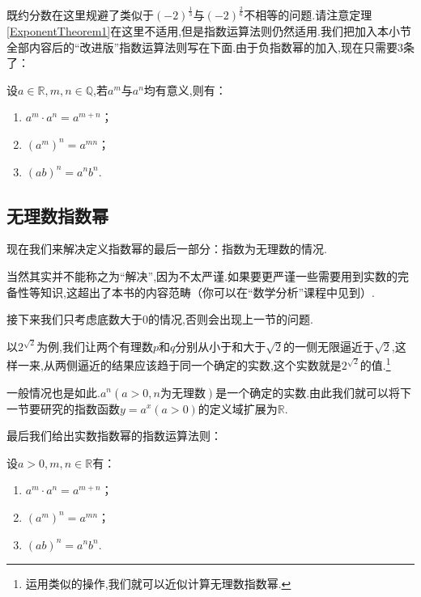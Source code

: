 \documentclass[lang=cn,math=cm,chinesefont=nofont,11pt,scheme=chinese,twocol]{elegantbook}
\begin{document}
既约分数在这里规避了类似于$(-2)^\frac{1}{3}$与$(-2)^\frac{2}{6}$不相等的问题.请注意定理\ref{ExponentTheorem1}在这里不适用,但是指数运算法则仍然适用.我们把加入本小节全部内容后的“改进版”指数运算法则写在下面.由于负指数幂的加入,现在只需要3条了：

\begin{property}\label{LawOfIndices2}
  设$a\in\mathbb{R},m,n\in\mathbb{Q}$,若$a^m$与$a^n$均有意义,则有：
  \begin{enumerate}
    \item $a^m\cdot a^n=a^{m+n}$；
    \item $(a^m)^n=a^{mn}$；
    \item $(ab)^n=a^nb^n$.
    \end{enumerate}
\end{property}

\subsection{无理数指数幂}

现在我们来解决定义指数幂的最后一部分：指数为无理数的情况.

当然其实并不能称之为“解决”,因为不太严谨.如果要更严谨一些需要用到实数的完备性等知识,这超出了本书的内容范畴（你可以在“数学分析”课程中见到）.

接下来我们只考虑底数大于$0$的情况,否则会出现上一节的问题.

以$2^{\sqrt{2}}$为例,我们让两个有理数$p$和$q$分别从小于和大于$\sqrt{2}$的一侧无限逼近于$\sqrt{2}$,这样一来,从两侧逼近的结果应该趋于同一个确定的实数,这个实数就是$2^{\sqrt{2}}$的值.\footnote{运用类似的操作,我们就可以近似计算无理数指数幂.}

一般情况也是如此.$a^n(a>0,n\text{为无理数})$是一个确定的实数.由此我们就可以将下一节要研究的指数函数$y=a^x(a>0)$的定义域扩展为$\mathbb{R}$.

\hspace*{\fill}

最后我们给出实数指数幂的指数运算法则：

\begin{property}\label{LawOfIndices3}
  设$a>0,m,n\in\mathbb{R}$有：
  \begin{enumerate}
    \item $a^m\cdot a^n=a^{m+n}$；
    \item $(a^m)^n=a^{mn}$；
    \item $(ab)^n=a^nb^n$.
    \end{enumerate}
\end{property}
\end{document}
